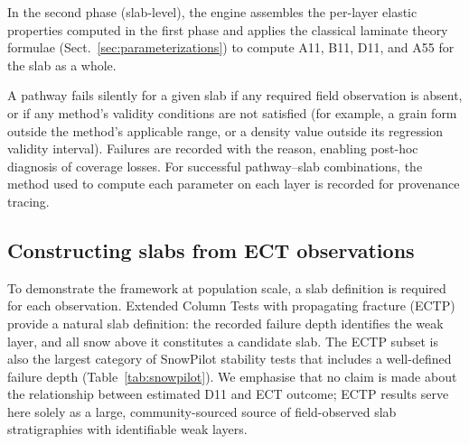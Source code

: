 \documentclass[hess, manuscript]{copernicus}
\begin{document}
In the second phase (slab-level), the engine assembles the per-layer elastic properties computed in the first phase and applies the classical laminate theory formulae (Sect.~\ref{sec:parameterizations}) to compute A11, B11, D11, and A55 for the slab as a whole.

A pathway fails silently for a given slab if any required field observation is absent, or if any method's validity conditions are not satisfied (for example, a grain form outside the method's applicable range, or a density value outside its regression validity interval). Failures are recorded with the reason, enabling post-hoc diagnosis of coverage losses. For successful pathway--slab combinations, the method used to compute each parameter on each layer is recorded for provenance tracing.


\subsection{Constructing slabs from ECT observations}
\label{sec:ectp_slabs}


To demonstrate the framework at population scale, a slab definition is required for each observation. Extended Column Tests with propagating fracture (ECTP) provide a natural slab definition: the recorded failure depth identifies the weak layer, and all snow above it constitutes a candidate slab. The ECTP subset is also the largest category of SnowPilot stability tests that includes a well-defined failure depth (Table~\ref{tab:snowpilot}). We emphasise that no claim is made about the relationship between estimated D11 and ECT outcome; ECTP results serve here solely as a large, community-sourced source of field-observed slab stratigraphies with identifiable weak layers.

\end{document}
